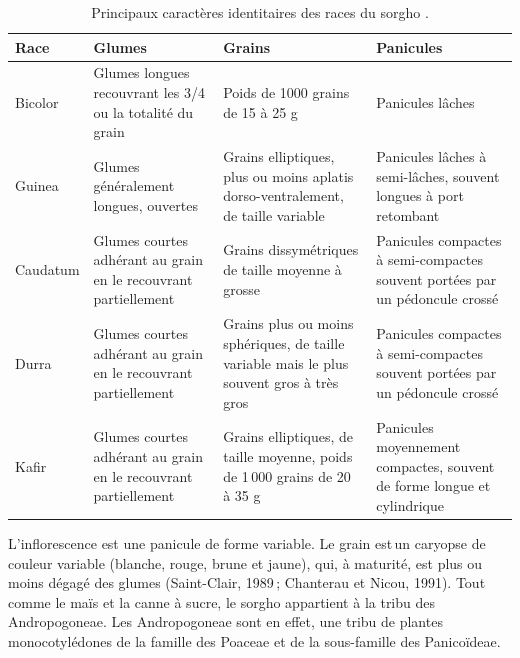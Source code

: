 \documentclass[a4paper,11pt]{article}
\begin{document}
\begin{table}
\begin{center}
  \begin{tabular}{|lp{4cm}|p{3.5cm}|p{3.5cm}|}
   \hline
  Race  & Glumes  & Grains  & Panicules  \\ \hline
  Bicolor  & Glumes longues recouvrant les 3/4 ou la totalité du grain  & Poids de 1000 grains de 15 à 25 g  & Panicules lâches \\ \hline
  Guinea  & Glumes généralement longues, ouvertes & Grains elliptiques, plus ou moins aplatis dorso-ventralement, de taille variable & Panicules lâches à semi-lâches, souvent longues à port retombant \\ \hline
  Caudatum & Glumes courtes adhérant au grain en le recouvrant partiellement & Grains dissymétriques de taille moyenne à grosse & Panicules compactes à semi-compactes souvent portées par un pédoncule crossé \\ \hline
  Durra & Glumes courtes adhérant au grain en le recouvrant partiellement & Grains plus ou moins sphériques, de taille variable mais le plus souvent gros à très gros & Panicules compactes à semi-compactes souvent portées par un pédoncule crossé \\ \hline
  Kafir & Glumes courtes adhérant au grain en le recouvrant partiellement & Grains elliptiques, de taille moyenne, poids de 1\,000 grains de 20 à 35 g & Panicules moyennement compactes, souvent de forme longue et cylindrique \\ \hline
\end{tabular}
\caption{Principaux caractères identitaires des races du sorgho \protect\cite{Chantereau_2013}.}
\label{tableau:Chantereau_2013}
\end{center}
\end{table}


 
\newpage



L’inflorescence est une panicule de forme variable. Le grain est\,un
caryopse de couleur variable (blanche, rouge, brune et jaune), qui, à
maturité, est plus ou moins dégagé des glumes (Saint-Clair, 1989\,;
Chanterau et Nicou, 1991). Tout comme le maïs et la canne à sucre, le
sorgho appartient à la tribu des Andropogoneae. Les Andropogoneae sont
en effet, une tribu de plantes monocotylédones de la famille des
Poaceae et de la sous-famille des Panicoïdeae.
\end{document}
